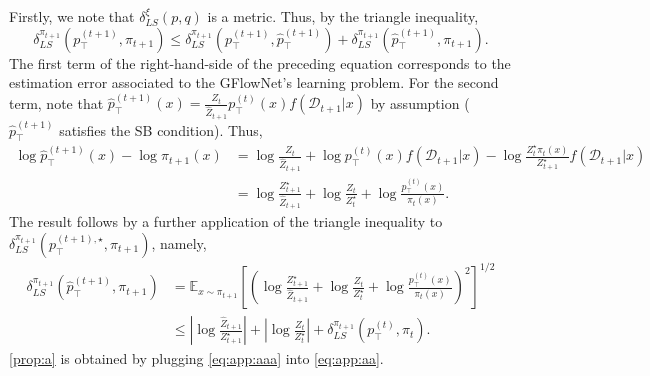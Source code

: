 \documentclass{article}
\theoremstyle{plain}
\theoremstyle{definition}
\theoremstyle{remark}
\theoremstyle{remark}
\begin{document}
Firstly, we note that $\delta_{LS}^{\xi}(p, q)$ is a metric. Thus, by the triangle inequality, 
\begin{equation} \label{eq:app:aa} 
    \delta_{LS}^{\pi_{t + 1}}\left(p_{\top}^{(t + 1)}, \pi_{t + 1}\right) \le \delta_{LS}^{\pi_{t + 1}}\left(p_{\top}^{(t + 1)}, \hat{p}_{\top}^{(t + 1)}\right) + \delta_{LS}^{\pi_{t + 1}}\left(\hat{p}_{\top}^{(t + 1)}, \pi_{t + 1} \right).  
\end{equation}
The first term of the right-hand-side of the preceding equation corresponds to the estimation error associated to the GFlowNet's learning problem. For the second term, note that $\hat{p}_{\top}^{(t + 1)}(x) = \frac{Z_{t}}{\hat{Z}_{t + 1}} p_{\top}^{(t)}(x) f(\mathcal{D}_{ t + 1 } | x)$ by assumption ($\hat{p}_{\top}^{(t + 1)}$ satisfies the SB condition). Thus, 
\begin{equation*}
    \begin{aligned} 
        \log \hat{p}_{\top}^{(t + 1)}(x) - \log \pi_{t + 1}(x) &= \log \frac{Z_{t}}{\hat{Z}_{t + 1}} + \log p_{\top}^{(t)}(x) f(\mathcal{D}_{t + 1}|x) -  \log \frac{Z_{t}^{\star}\pi_{t}(x)}{Z_{t + 1}^{\star}} f(\mathcal{D}_{t + 1} | x) \\ 
        &= \log \frac{Z_{t + 1}^{\star}}{\hat{Z}_{t + 1}} + \log \frac{Z_{t}}{Z_{t}^{\star}} + \log \frac{p_{\top}^{(t)}(x)}{\pi_{t}(x)}. %
    \end{aligned} 
\end{equation*}
The result follows by a further application of the triangle inequality to $\delta_{LS}^{\pi_{t + 1}}\left(p_{\top}^{(t + 1), \star}, \pi_{t + 1}\right)$, namely,  
\begin{equation} \label{eq:app:aaa} 
    \begin{aligned} 
        \delta_{LS}^{\pi_{t + 1}}\left(\hat{p}_{\top}^{(t + 1)}, \pi_{t + 1}\right) &= \mathbb{E}_{x \sim \pi_{t + 1}} \left[ \left( \log \frac{Z_{t + 1}^{\star}}{\hat{Z}_{t + 1}} + \log \frac{Z_{t}}{Z_{t}^{\star}} + \log \frac{p_{\top}^{(t)}(x)}{\pi_{t}(x)}  \right)^{2} \right]^{1/2} \\ 
        &\le \left| \log \frac{\hat{Z}_{t + 1}}{Z_{t + 1}^{\star}} \right| + \left| \log \frac{Z_{t}}{Z_{t}^{\star}}\right| + \delta_{LS}^{\pi_{t + 1}}\left(p_{\top}^{(t)}, \pi_{t}\right). 
    \end{aligned} 
\end{equation}
\autoref{prop:a} is obtained by plugging \autoref{eq:app:aaa} into \autoref{eq:app:aa}. 

\end{document}
